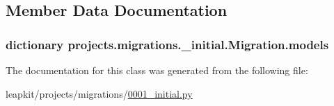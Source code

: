 \subsection{Member Data Documentation}
\hypertarget{classprojects_1_1migrations_1_10001__initial_1_1_migration_a832186aa55199c68090347fe77492b70}{
\subsubsection[{models}]{\setlength{\rightskip}{0pt plus 5cm}dictionary projects.\-migrations.\-\_\-initial.\-Migration.\-models\hspace{0.3cm}{\ttfamily [static]}}}\label{classprojects_1_1migrations_1_10001__initial_1_1_migration_a832186aa55199c68090347fe77492b70}


The documentation for this class was generated from the following file\-:\begin{DoxyCompactItemize}
\item 
leapkit/projects/migrations/\hyperlink{projects_2migrations_20001__initial_8py}{0001\-\_\-initial.\-py}\end{DoxyCompactItemize}
